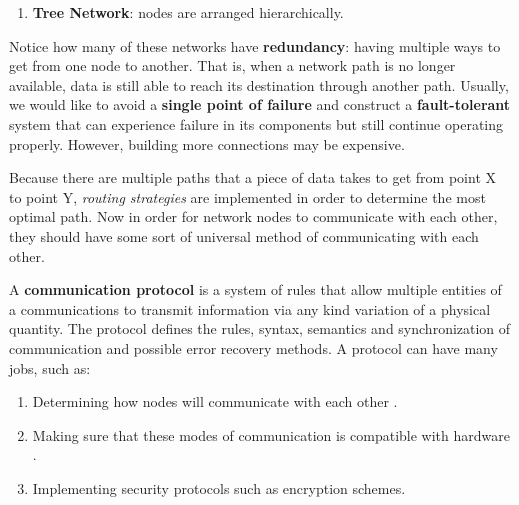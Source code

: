 \documentclass{article}
\begin{document}
\begin{example}
\begin{enumerate}
        \item \textbf{Tree Network}: nodes are arranged hierarchically.
          \begin{center}
          \end{center}
      \end{enumerate} 
    \end{example}

    Notice how many of these networks have \textbf{redundancy}: having multiple ways to get from one node to another. That is, when a network path is no longer available, data is still able to reach its destination through another path. Usually, we would like to avoid a \textbf{single point of failure} and construct a \textbf{fault-tolerant} system that can experience failure in its components but still continue operating properly. However, building more connections may be expensive. 

    Because there are multiple paths that a piece of data takes to get from point X to point Y, \textit{routing strategies} are implemented in order to determine the most optimal path. Now in order for network nodes to communicate with each other, they should have some sort of universal method of communicating with each other. 

    \begin{definition}
      A \textbf{communication protocol} is a system of rules that allow multiple entities of a communications to transmit information via any kind variation of a physical quantity. The protocol defines the rules, syntax, semantics and synchronization of communication and possible error recovery methods. A protocol can have many jobs, such as: 
      
      \begin{enumerate} 
        \item Determining how nodes will communicate with each other . 
        \item Making sure that these modes of communication is compatible with hardware .
        \item Implementing security protocols such as encryption schemes. 
      \end{enumerate}
    \end{definition}
\end{document}
